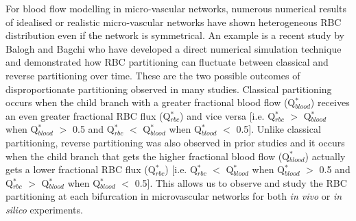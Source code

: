\noindent For blood flow modelling in micro-vascular networks, numerous numerical results of idealised\cite{DominikObrist2010Rbcd, Balogh2018, Balogh2017DirectNetworks} or realistic\cite{2020Charles} micro-vascular networks have shown heterogeneous RBC distribution even if the network is symmetrical. An example is a recent study by Balogh and Bagchi\cite{Balogh2017DirectNetworks, Balogh2018} who have developed a direct numerical simulation technique and demonstrated how RBC partitioning can fluctuate between classical and reverse partitioning over time. These are the two possible outcomes of disproportionate partitioning observed in many studies. Classical partitioning occurs when the child branch with a greater fractional blood flow (Q$^{*}_{blood}$) receives an even greater fractional RBC flux (Q$^{*}_{rbc}$) and vice versa [i.e. Q$^{*}_{rbc}$ $>$ Q$^{*}_{blood}$ when Q$^{*}_{blood}$ $>$ 0.5 and Q$^{*}_{rbc}$ $<$ Q$^{*}_{blood}$ when Q$^{*}_{blood}$ $<$ 0.5]. Unlike classical partitioning, reverse partitioning was also observed in prior studies\cite{ShenZaiyi2016Iohp, PRIES198981, SCHMIDSCHONBEIN198018, Sherwood2014} and it occurs when the child branch that gets the higher fractional blood flow (Q$^{*}_{blood}$) actually gets a lower fractional RBC flux (Q$^{*}_{rbc}$) [i.e. Q$^{*}_{rbc}$ $<$ Q$^{*}_{blood}$ when Q$^{*}_{blood}$ $>$ 0.5 and Q$^{*}_{rbc}$ $>$ Q$^{*}_{blood}$ when Q$^{*}_{blood}$ $<$ 0.5]. This allows us to observe and study the RBC partitioning at each bifurcation in microvascular networks for both \textit{in vivo} or \textit{in silico} experiments. 




